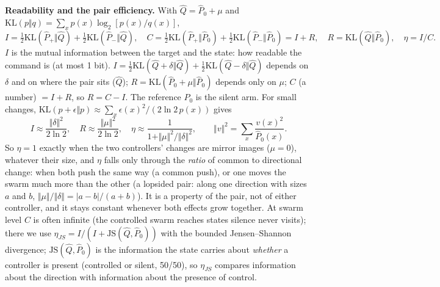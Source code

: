 \documentclass[10pt,a4paper]{article}
\begin{document}
\noindent\textbf{Readability and the pair efficiency.} With $\hat Q = \hat P_0 + \mu$ and
$\mathrm{KL}(p\Vert q) = \sum_x p(x)\log_2[p(x)/q(x)]$,
\begin{equation}\label{eq:eta}
I = \tfrac12\mathrm{KL}(\hat P_+\Vert\hat Q) + \tfrac12\mathrm{KL}(\hat P_-\Vert\hat Q),\quad
C = \tfrac12\mathrm{KL}(\hat P_+\Vert\hat P_0) + \tfrac12\mathrm{KL}(\hat P_-\Vert\hat P_0) = I + R,\quad
R = \mathrm{KL}(\hat Q\Vert\hat P_0),\quad \eta = I/C .
\end{equation}
$I$ is the mutual information between the target and the state: how readable the command is
(at most 1 bit). $I = \frac12\mathrm{KL}(\hat Q+\delta\Vert\hat Q) + \frac12\mathrm{KL}(\hat Q-\delta\Vert\hat Q)$
depends on $\delta$ and on where the pair sits ($\hat Q$); $R = \mathrm{KL}(\hat P_0+\mu\Vert\hat P_0)$ depends
only on $\mu$; $C$ (a number) $= I + R$, so $R = C - I$. The reference $\hat P_0$ is the silent arm. For
small changes, $\mathrm{KL}(p+\epsilon\Vert p) \approx \sum_x \epsilon(x)^2/(2\ln 2\,p(x))$ gives
\begin{equation}\label{eq:etasmall}
I \approx \frac{\Vert\delta\Vert^2}{2\ln 2},\quad R \approx \frac{\Vert\mu\Vert^2}{2\ln 2},\quad
\eta \approx \frac{1}{1 + \Vert \mu\Vert^2/\Vert\delta\Vert^2},\qquad \Vert v\Vert^2 = \sum_x \frac{v(x)^2}{\hat P_0(x)} .
\end{equation}
So $\eta = 1$ exactly when the two controllers' changes are mirror images ($\mu = 0$), whatever their
size, and $\eta$ falls only through the \emph{ratio} of common to directional change: when both push
the same way (a common push), or one moves the swarm much more than the other (a lopsided pair:
along one direction with sizes $a$ and $b$, $\Vert \mu\Vert/\Vert\delta\Vert = |a-b|/(a+b)$). It is a
property of the pair, not of either controller, and it stays constant whenever both effects grow
together. At swarm level $C$ is often infinite (the controlled swarm reaches states silence never
visits); there we use $\eta_{JS} = I/(I + \mathrm{JS}(\hat Q,\hat P_0))$ with the bounded
Jensen--Shannon divergence; $\mathrm{JS}(\hat Q,\hat P_0)$ is the information the state carries about
\emph{whether} a controller is present (controlled or silent, 50/50), so $\eta_{JS}$ compares
information about the direction with information about the presence of control.
\end{document}
